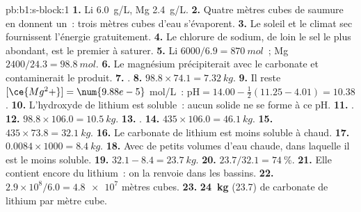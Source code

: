 \begin{solution}{pb:b1:s-block:1}
\textbf{1.} Li \qty{6.0}{g/L}, Mg \qty{2.4}{g/L}.
\textbf{2.} Quatre mètres cubes de saumure en donnent un~: trois mètres
cubes d'eau s'évaporent.
\textbf{3.} Le soleil et le climat sec fournissent l'énergie
gratuitement.
\textbf{4.} Le chlorure de sodium, de loin le sel le plus abondant, est
le premier à saturer.
\textbf{5.} Li $6000/6.9 = \qty{870}{mol}$~; Mg $2400/24.3 = \qty{98.8}{mol}$.
\textbf{6.} Le magnésium précipiterait avec le carbonate et
contaminerait le produit.
\textbf{7.} .
\textbf{8.} $98.8 \times 74.1 = \qty{7.32}{kg}$.
\textbf{9.} Il reste $[\ce{Mg^2+}] = \num{9.88e-5}$ mol/L~: $\mathrm{pH} = 14.00 -
\frac12(11.25 - 4.01) = 10.38$.
\textbf{10.} L'hydroxyde de lithium est soluble~: aucun solide ne se
forme à ce pH.
\textbf{11.} .
\textbf{12.} $98.8 \times 106.0 = \qty{10.5}{kg}$.
\textbf{13.} .
\textbf{14.} $435 \times 106.0 = \qty{46.1}{kg}$.
\textbf{15.} $435 \times 73.8 = \qty{32.1}{kg}$.
\textbf{16.} Le carbonate de lithium est moins soluble à chaud.
\textbf{17.} $0.0084 \times 1000 = \qty{8.4}{kg}$.
\textbf{18.} Avec de petits volumes d'eau chaude, dans laquelle il est le
moins soluble.
\textbf{19.} $32.1 - 8.4 = \qty{23.7}{kg}$.
\textbf{20.} $23.7/32.1 = \qty{74}{\percent}$.
\textbf{21.} Elle contient encore du lithium~: on la renvoie dans les
bassins.
\textbf{22.} $2.9 \times 10^8/6.0 = \num{4.8e7}$ mètres cubes.
\textbf{23.} \textbf{\qty{24}{kg}} (23.7) de carbonate de lithium par
mètre cube.
\end{solution}
